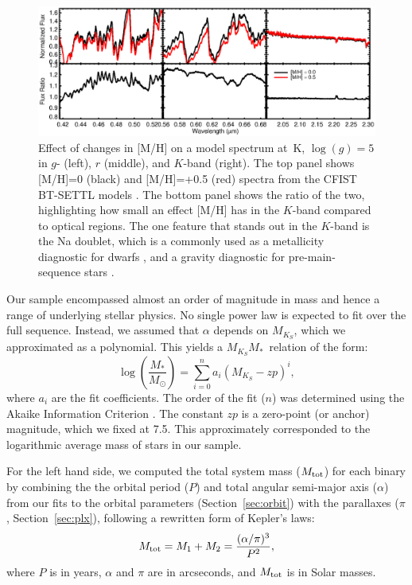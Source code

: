 \documentclass[twocolumn]{aastex62}
\newcommand{\mks}{$M_{K_S}$}
\newcommand{\mmk}{$M_{K_S}$\textendash$M_*$}
\begin{document}
\begin{figure}[htb]
\begin{center}
\includegraphics[width=\textwidth]{metallicity_effect.eps}
\caption{Effect of changes in [M/H] on a model spectrum at \,K, $\log(g)=5$ in $g$- (left), $r$ (middle), and $K$-band (right). The top panel shows [M/H]=0 (black) and [M/H]=+0.5 (red) spectra from the CFIST BT-SETTL models \citep{2012RSPTA.370.2765A}. The bottom panel shows the ratio of the two, highlighting how small an effect [M/H] has in the $K$-band compared to optical regions. The one feature that stands out in the $K$-band is the Na doublet, which is a commonly used as a metallicity diagnostic for dwarfs \citep{2010ApJ...720L.113R,Terrien:2012lr,Newton:2014}, and a gravity diagnostic for pre-main-sequence stars \citep[e.g.,][]{Schlieder2012}. }
\label{fig:metal}
\end{center}
\end{figure}

Our sample encompassed almost an order of magnitude in mass and hence a range of underlying stellar physics. No single power law is expected to fit over the full sequence. Instead, we assumed that $\alpha$ depends on \mks, which we approximated as a polynomial. This yields a \mmk\ relation of the form:
\begin{equation}\label{eqn:mmk}
\log \left( \frac{M_*}{M_\odot} \right) = \sum_{i=0}^{n} a_i(M_{K_S}-zp)^i,
\end{equation}
where $a_i$ are the fit coefficients. The order of the fit ($n$) was determined using the Akaike Information Criterion \citep[AIC, ][]{Akaike1974}. The constant $zp$ is a zero-point (or anchor) magnitude, which we fixed at 7.5. This approximately corresponded to the logarithmic average mass of stars in our sample. 

For the left hand side, we computed the total system mass ($M_{\rm{tot}}$) for each binary by combining the the orbital period ($P$) and total angular semi-major axis ($\alpha$) from our fits to the orbital parameters (Section~\ref{sec:orbit}) with the parallaxes ($\pi$, Section~\ref{sec:plx}), following a rewritten form of Kepler's laws:
\begin{equation}\label{eqn:mass}
M_{\rm{tot}} = M_{1}+M_{2} = \frac{(\alpha/\pi)^3}{P^2},
\end{equation}
where $P$ is in years, $\alpha$ and $\pi$ are in arcseconds, and $M_{\rm{tot}}$ is in Solar masses. 
\end{document}
